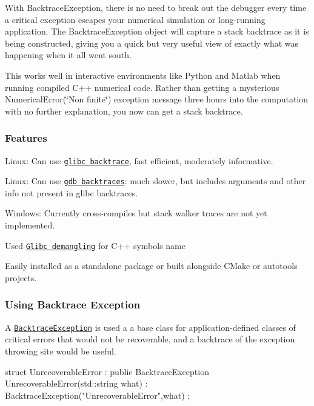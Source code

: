With Backtrace\-Exception, there is no need to break out the debugger every time a critical exception escapes your numerical simulation or long-\/running application. The Backtrace\-Exception object will capture a stack backtrace as it is being constructed, giving you a quick but very useful view of exactly what was happening when it all went south.

This works well in interactive environments like Python and Matlab when running compiled C++ numerical code. Rather than getting a mysterious {\ttfamily Numerical\-Error(\char`\"{}\-Non finite\char`\"{})} exception message three hours into the computation with no further explanation, you now can get a stack backtrace.

\subsubsection*{Features}


\begin{DoxyItemize}
\item Linux\-: Can use \href{https://www.gnu.org/software/libc/manual/html_node/Backtraces.html}{\tt glibc backtrace}, fast efficient, moderately informative.
\item Linux\-: Can use \href{https://ftp.gnu.org/old-gnu/Manuals/gdb/html_node/gdb_42.html}{\tt gdb backtraces}\-: much slower, but includes arguments and other info not present in glibc backtraces.
\item Windows\-: Currently cross-\/compiles but stack walker traces are not yet implemented.
\item Used \href{https://gcc.gnu.org/onlinedocs/libstdc++/manual/ext_demangling.html}{\tt Glibc demangling} for C++ symbols name
\item Easily installed as a standalone package or built alongside C\-Make or autotools projects.
\end{DoxyItemize}

\subsubsection*{Using Backtrace Exception}

A \href{https://markjolah.github.io/BacktraceException/classbacktrace__exception_1_1BacktraceException.html}{\tt Backtrace\-Exception} is used a a base class for application-\/defined classes of critical errors that would not be recoverable, and a backtrace of the exception throwing site would be useful. \begin{DoxyVerb}struct UnrecoverableError : public BacktraceException {
    UnrecoverableError(std::string what) : BacktraceException("UnrecoverableError",what) {}
};
\end{DoxyVerb}



